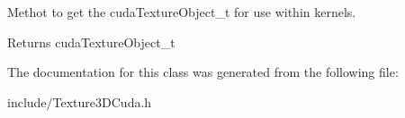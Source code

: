 Methot to get the cuda\+Texture\+Object\+\_\+t for use within kernels. 

\begin{DoxyReturn}{Returns}
cuda\+Texture\+Object\+\_\+t 
\end{DoxyReturn}


The documentation for this class was generated from the following file\+:\begin{DoxyCompactItemize}
\item 
include/Texture3\+D\+Cuda.\+h\end{DoxyCompactItemize}
